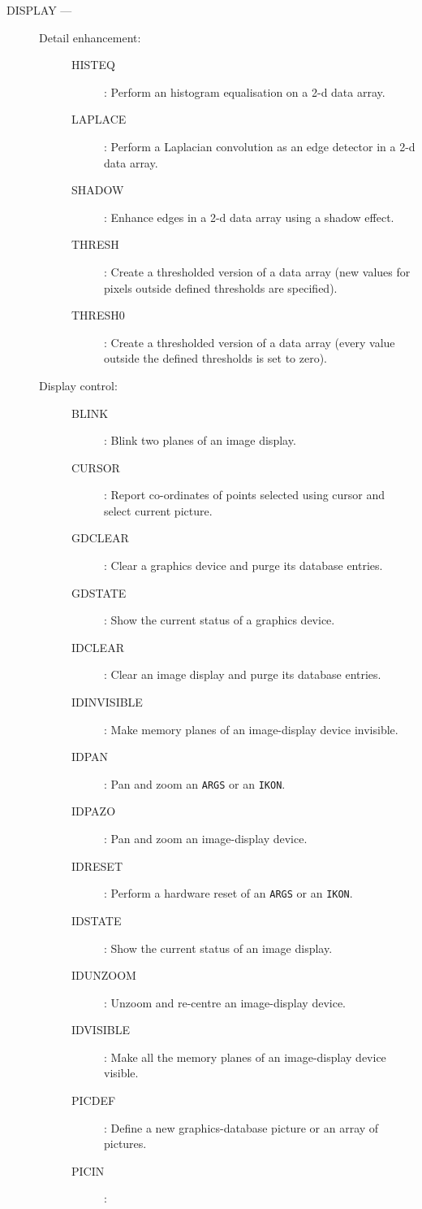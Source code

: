 \begin{description}
\item [DISPLAY ---]
\begin{description}
\item [Detail enhancement:]\hfill
\begin{description}
\item [HISTEQ]:
 Perform an histogram equalisation on a 2-d data array.
\item [LAPLACE]:
 Perform a Laplacian convolution as an edge detector in a 2-d data array.
\item [SHADOW]:
 Enhance edges in a 2-d data array using a shadow effect.
\item [THRESH]:
 Create a thresholded version of a data array (new values for pixels outside
 defined thresholds are specified).
\item [THRESH0]:
 Create a thresholded version of a data array (every value outside the defined
 thresholds is set to zero).
\end{description}
\item [Display control:]\hfill
\begin{description}
\item [BLINK]:
 Blink two planes of an image display.
\item [CURSOR]:
 Report co-ordinates of points selected using cursor and select current picture.
\item [GDCLEAR]:
 Clear a graphics device and purge its database entries.
\item [GDSTATE]:
 Show the current status of a graphics device.
\item [IDCLEAR]:
 Clear an image display and purge its database entries.
\item [IDINVISIBLE]:
 Make memory planes of an image-display device invisible.
\item [IDPAN]:
 Pan and zoom an {\tt ARGS} or an {\tt IKON}.
\item [IDPAZO]:
 Pan and zoom an image-display device.
\item [IDRESET]:
 Perform a hardware reset of an {\tt ARGS} or an {\tt IKON}.
\item [IDSTATE]:
 Show the current status of an image display.
\item [IDUNZOOM]:
 Unzoom and re-centre an image-display device.
\item [IDVISIBLE]:
 Make all the memory planes of an image-display device visible.
\item [PICDEF]:
 Define a new graphics-database picture or an array of pictures.
\item [PICIN]:

\end{description}
\end{description}
\end{description}
